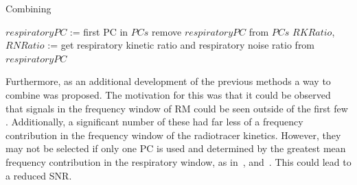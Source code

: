                     \begin{algorithm}
                        \caption{Combining }
                        \;
                        $respiratoryPC$ := first \gls{PC} in $PCs$\;
                        remove $respiratoryPC$ from $PCs$\;
                        $RKRatio$, $RNRatio$ := get respiratory kinetic ratio and respiratory noise ratio from $respiratoryPC$\;
                        \;
                    \end{algorithm} \label{eq:pca_data_driven_surrogate_signal_extraction_methods_for_dynamic_pet_methods_combining_pcs_pseudo_code}
                    
                    Furthermore, as an additional development of the previous methods a way to combine  was proposed. The motivation for this was that it could be observed that signals in the frequency window of \gls{RM} could be seen outside of the first few . Additionally, a significant number of these had far less of a frequency contribution in the frequency window of the radiotracer kinetics. However, they may not be selected if only one \gls{PC} is used and determined by the greatest mean frequency contribution in the respiratory window, as in~, and~. This could lead to a reduced \gls{SNR}.
                    
